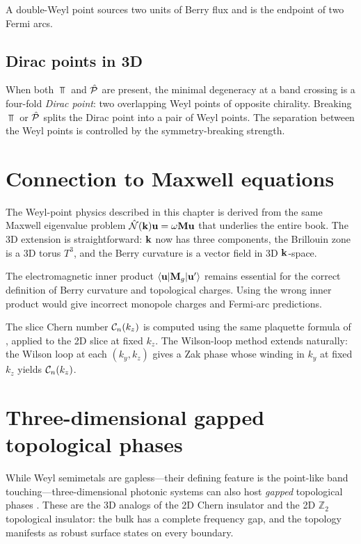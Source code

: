 A double-Weyl point sources two units of Berry flux and is the endpoint
of two Fermi arcs.

\subsection{Dirac points in 3D}
\label{sec:ch15-3d-dirac}

When both $\Top$ and $\hat{\mathcal{P}}$ are present, the minimal degeneracy at a
band crossing is a four-fold \emph{Dirac point}: two overlapping Weyl
points of opposite chirality.  Breaking $\Top$ or $\hat{\mathcal{P}}$ splits the
Dirac point into a pair of Weyl points.  The separation between the
Weyl points is controlled by the symmetry-breaking strength.

\section{Connection to Maxwell equations}
\label{sec:ch15-maxwell}

The Weyl-point physics described in this chapter is derived from the
same Maxwell eigenvalue problem $\hat{\mathcal{N}}(\mathbf{k})\mathbf{u}=\omega\mathbf{M}
\mathbf{u}$ that underlies the entire book.  The 3D extension is
straightforward: $\mathbf{k}$ now has three components, the Brillouin zone
is a 3D torus $T^3$, and the Berry curvature is a vector field in
3D $\mathbf{k}$-space.

The electromagnetic inner product
$\langle\mathbf{u}|\mathbf{M}_g|\mathbf{u}'\rangle$ remains essential for
the correct definition of Berry curvature and topological charges.
Using the wrong inner product would give incorrect monopole charges
and Fermi-arc predictions.

The slice Chern number $\mathcal{C}_n(k_z)$ is computed using the same
plaquette formula of , applied to the
2D slice at fixed $k_z$.  The Wilson-loop method extends naturally:
the Wilson loop at each $(k_y,k_z)$ gives a Zak phase whose winding
in $k_y$ at fixed $k_z$ yields $\mathcal{C}_n(k_z)$.

\section{Three-dimensional gapped topological phases}
\label{sec:ch15-3d-gapped}

While Weyl semimetals are gapless---their defining feature is the
point-like band touching---three-dimensional photonic systems can also
host \emph{gapped} topological phases
\cite{yang2026non,armitage2017weyl}.  These are the 3D analogs of
the 2D Chern insulator and the 2D $\mathbb{Z}_2$ topological
insulator: the bulk has a complete frequency gap, and the topology
manifests as robust surface states on every boundary.

